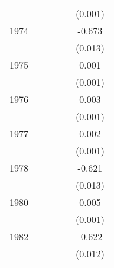 {\begin{tabular}{l*{5}{c}}
                    &                     &                     &                     &                     &     (0.001)         \\
[1em]
1974                &                     &                     &                     &                     &      -0.673\sym{***}\\
                    &                     &                     &                     &                     &     (0.013)         \\
[1em]
1975                &                     &                     &                     &                     &       0.001         \\
                    &                     &                     &                     &                     &     (0.001)         \\
[1em]
1976                &                     &                     &                     &                     &       0.003         \\
                    &                     &                     &                     &                     &     (0.001)         \\
[1em]
1977                &                     &                     &                     &                     &       0.002         \\
                    &                     &                     &                     &                     &     (0.001)         \\
[1em]
1978                &                     &                     &                     &                     &      -0.621\sym{***}\\
                    &                     &                     &                     &                     &     (0.013)         \\
[1em]
1980                &                     &                     &                     &                     &       0.005\sym{***}\\
                    &                     &                     &                     &                     &     (0.001)         \\
[1em]
1982                &                     &                     &                     &                     &      -0.622\sym{***}\\
                    &                     &                     &                     &                     &     (0.012)         \\

\end{tabular}}
